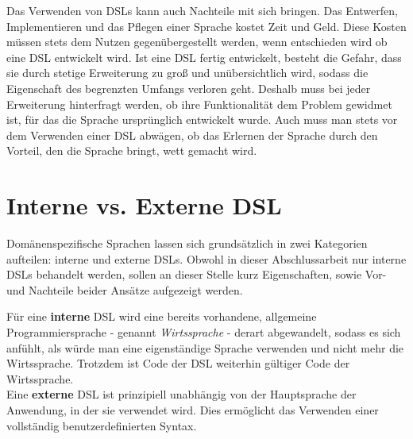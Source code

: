 Das Verwenden von DSLs kann auch Nachteile mit sich bringen. Das Entwerfen, Implementieren und das Pflegen einer Sprache kostet Zeit und Geld. Diese Kosten müssen stets dem Nutzen gegenübergestellt werden, wenn entschieden wird ob eine DSL entwickelt wird. Ist eine DSL fertig entwickelt, besteht die Gefahr, dass sie durch stetige Erweiterung zu groß und unübersichtlich wird, sodass die Eigenschaft des begrenzten Umfangs verloren geht. Deshalb muss bei jeder Erweiterung hinterfragt werden, ob ihre Funktionalität dem Problem gewidmet ist, für das die Sprache ursprünglich entwickelt wurde. Auch muss man stets vor dem Verwenden einer DSL abwägen, ob das Erlernen der Sprache durch den Vorteil, den die Sprache bringt, wett gemacht wird\cite{www:fowlerWorkbench}.

\section{Interne vs. Externe DSL}\label{sct:intvsext}
Domänenspezifische Sprachen lassen sich grundsätzlich in zwei Kategorien aufteilen: interne und externe DSLs. Obwohl in dieser Abschlussarbeit nur interne DSLs behandelt werden, sollen an dieser Stelle kurz Eigenschaften, sowie Vor- und Nachteile beider Ansätze aufgezeigt werden.

Für eine \textbf{interne} DSL wird eine bereits vorhandene, allgemeine Programmiersprache - genannt \emph{Wirtssprache} - derart abgewandelt, sodass es sich anfühlt, als würde man eine eigenständige Sprache verwenden und nicht mehr die Wirtssprache. Trotzdem ist Code der DSL weiterhin gültiger Code der Wirtssprache.\\
Eine \textbf{externe} DSL ist prinzipiell unabhängig von der Hauptsprache der Anwendung, in der sie verwendet wird. Dies ermöglicht das Verwenden einer vollständig benutzerdefinierten Syntax.


